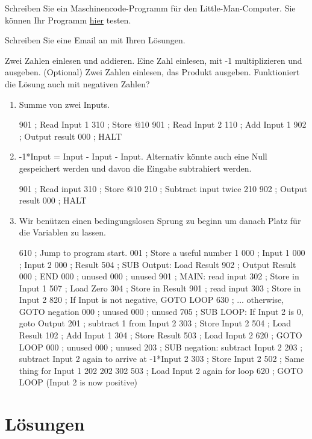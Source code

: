 \begin{question}
    Schreiben Sie ein Maschinencode-Programm für den Little-Man-Computer. Sie können Ihr Programm \href{https://oinf.ch/interactive/little-man-computer/}{hier} testen.

    Schreiben Sie eine Email an \mail{} mit Ihren Lösungen.
    \begin{tasks}
        \task Zwei Zahlen einlesen und addieren. 
        \task Eine Zahl einlesen, mit -1 multiplizieren und ausgeben.
        \task (Optional) Zwei Zahlen einlesen, das Produkt ausgeben. Funktioniert die Lösung auch mit negativen Zahlen?
    \end{tasks}
\end{question}
\cprotEnv\begin{solution}
    \begin{enumerate}[label=\alph*)]
        \item Summe von zwei Inputs.
		\begin{assembly}
901  ; Read Input 1
310  ; Store @10
901  ; Read Input 2
110  ; Add Input 1
902  ; Output result
000  ; HALT
        \end{assembly}
        
        \item  -1*Input = Input - Input - Input. Alternativ könnte auch eine Null gespeichert werden und davon die Eingabe subtrahiert werden.
			 \begin{assembly}
901  ; Read input
310  ; Store @10
210  ; Subtract input twice
210
902  ; Output result
000  ; HALT
        \end{assembly}

        \item Wir benützen einen bedingungslosen Sprung zu beginn um danach Platz für die Variablen zu lassen.
			\begin{assembly}
610  ; Jump to program start.
001  ; Store a useful number 1
000  ; Input 1
000  ; Input 2
000  ; Result
504  ; SUB Output: Load Result 
902  ; Output Result
000  ; END
000  ; unused
000  ; unused
901  ; MAIN: read input
302  ; Store in Input 1
507  ; Load Zero
304  ; Store in Result
901  ; read input
303  ; Store in Input 2
820  ; If Input is not negative, GOTO LOOP
630  ; ... otherwise, GOTO negation
000  ; unused
000  ; unused
705  ; SUB LOOP: If Input 2 is 0, goto Output
201  ; subtract 1 from Input 2
303  ; Store Input 2
504  ; Load Result
102  ; Add Input 1
304  ; Store Result
503  ; Load Input 2
620  ; GOTO LOOP
000  ; unused
000  ; unused
203  ; SUB negation: subtract Input 2
203  ; subtract Input 2 again to arrive at -1*Input 2
303  ; Store Input 2
502  ; Same thing for Input 1
202
202
302
503  ; Load Input 2 again for loop
620  ; GOTO LOOP (Input 2 is now positive)
           \end{assembly}
    \end{enumerate}
\end{solution}  

\newpage

\section*{Lösungen}
\printsolutions




